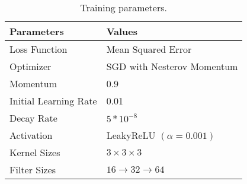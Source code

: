 \begin{table}[h!]
	\centering
	\begin{tabular}{l l} \hline
		\textbf{Parameters} & \textbf{Values} \\ \hline
		Loss Function & Mean Squared Error \\
		Optimizer & SGD  with Nesterov Momentum \\
		Momentum & 0.9 \\
		Initial Learning Rate & 0.01 \\
		Decay Rate & $5 * 10^{-8}$ \\
		Activation & LeakyReLU $(\alpha = 0.001)$ \\
		Kernel Sizes & $3 \times 3 \times 3$ \\
		Filter Sizes & $16 \to 32 \to 64$ \\ \hline
	\end{tabular}
	\caption{Training parameters.}
	\label{table:architecture}
\end{table}





